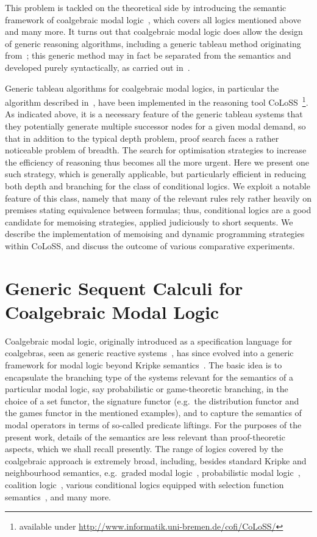 \documentclass{entcs} \usepackage{entcsmacro}
\newcommand{\COLOSS}{{\textrm CoLoSS}}
\begin{document}
This problem is tackled on the theoretical side by introducing the
semantic framework of coalgebraic modal
logic~\cite{Pattinson03,Schroder05}, which covers all logics mentioned
above and many more. It turns out that coalgebraic modal logic does
allow the design of generic reasoning algorithms, including a generic
tableau method originating from~\cite{SchroderPattinson09}; this
generic method may in fact be separated from the semantics and
developed purely syntactically, as carried out
in~\cite{PattinsonSchroder08b,PattinsonSchroder09a}. 

Generic tableau algorithms for coalgebraic modal logics, in particular
the algorithm described in~\cite{SchroderPattinson09}, have been
implemented in the reasoning tool
\COLOSS~\cite{CalinEA09}\footnote{available under
  \url{http://www.informatik.uni-bremen.de/cofi/CoLoSS/}}. As
indicated above, it is a necessary feature of the generic tableau
systems that they potentially generate multiple successor nodes for a
given modal demand, so that in addition to the typical depth problem,
proof search faces a rather noticeable problem of breadth. The search
for optimisation strategies to increase the efficiency of reasoning
thus becomes all the more urgent. Here we present one such strategy,
which is generally applicable, but particularly efficient in reducing
both depth and branching for the class of conditional logics. We
exploit a notable feature of this class, namely that many of the
relevant rules rely rather heavily on premises stating equivalence
between formulas; thus, conditional logics are a good candidate for
memoising strategies, applied judiciously to short sequents. We
describe the implementation of memoising and dynamic programming
strategies within \COLOSS, and discuss the outcome of various
comparative experiments.
 
\section{Generic Sequent Calculi for Coalgebraic Modal Logic}


Coalgebraic modal logic, originally introduced as a specification
language for coalgebras, seen as generic reactive
systems~\cite{Pattinson03}, has since evolved into a generic framework
for modal logic beyond Kripke semantics~\cite{CirsteaEA09}. The basic
idea is to encapsulate the branching type of the systems relevant for
the semantics of a particular modal logic, say probabilistic or
game-theoretic branching, in the choice of a set functor, the
signature functor (e.g.\ the distribution functor and the games
functor in the mentioned examples), and to capture the semantics of
modal operators in terms of so-called predicate liftings. For the
purposes of the present work, details of the semantics are less
relevant than proof-theoretic aspects, which we shall recall
presently. The range of logics covered by the coalgebraic approach is
extremely broad, including, besides standard Kripke and neighbourhood
semantics, e.g.\ graded modal logic~\cite{Fine72}, probabilistic modal
logic~\cite{FaginHalpern94}, coalition logic~\cite{Pauly02}, various
conditional logics equipped with selection function
semantics~\cite{Chellas80}, and many more.
\end{document}
